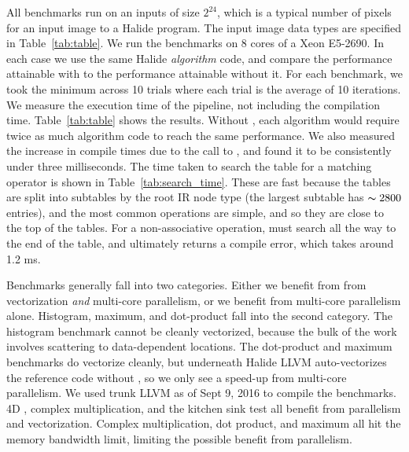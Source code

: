 All benchmarks run on an inputs of size $2^{24}$, which is a typical number of pixels for an input image to a Halide program. The input image data types are specified in Table~\ref{tab:table}. We run the benchmarks on 8 cores of a Xeon E5-2690. In each case we use the same Halide \emph{algorithm} code, and compare the performance attainable with  to the performance attainable without it. For each benchmark, we took the minimum across 10 trials where each trial is the average of 10 iterations. We measure the execution time of the pipeline, not including the compilation time. Table~\ref{tab:table} shows the results. Without , each algorithm would require twice as much algorithm code to reach the same performance. We also measured the increase in compile times due to the call to , and found it to be consistently under three milliseconds. The time taken to search the table for a matching operator is shown in Table~\ref{tab:search_time}. These are fast because the tables are split into subtables by the root IR node type (the largest subtable has $\thicksim 2800$ entries), and the most common operations are simple, and so they are close to the top of the tables. For a non-associative operation,  must search all the way to the end of the table, and ultimately returns a compile error, which takes around 1.2 ms. 

Benchmarks generally fall into two categories. Either we benefit from from vectorization \emph{and} multi-core parallelism, or we benefit from multi-core parallelism alone. Histogram, maximum, and dot-product fall into the second category. The histogram benchmark cannot be cleanly vectorized, because the bulk of the work involves scattering to data-dependent locations. The dot-product and maximum benchmarks do vectorize cleanly, but underneath Halide LLVM auto-vectorizes the reference code without , so we only see a speed-up from multi-core parallelism. We used trunk LLVM as of Sept 9, 2016 to compile the benchmarks. 4D , complex multiplication, and the kitchen sink test all benefit from parallelism and vectorization. Complex multiplication, dot product, and maximum all hit the memory bandwidth limit, limiting the possible benefit from parallelism.

